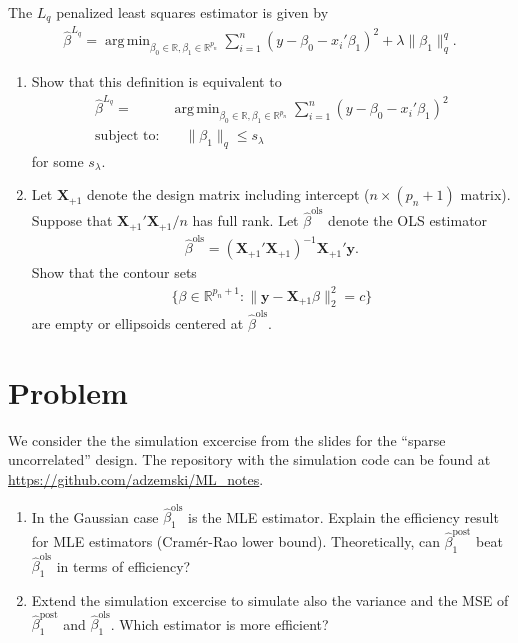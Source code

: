 \documentclass[a4paper]{scrartcl}
\DeclareMathOperator{\argmin}{arg\,min}
\begin{document}
The $L_q$ penalized least squares estimator is given by 
\begin{align*}
	\hat{\beta}^{L_q} = \argmin_{\beta_0 \in \mathbb{R}, \beta_1 \in \mathbb{R}^{p_n}} \sum_{i=1}^n \left(y - \beta_0 - x_i'\beta_1\right)^2 + \lambda \lVert \beta_1 \rVert_q^q. 
\end{align*}
\begin{enumerate}
	\item Show that this definition is equivalent to 
	\begin{align*}
		\hat{\beta}^{L_q} =& \argmin_{\beta_0 \in \mathbb{R}, \beta_1 \in \mathbb{R}^{p_n}} \sum_{i=1}^n \left(y - \beta_0 - x_i'\beta_1\right)^2
	\\
		\text{subject to:} & \quad  \lVert \beta_1 \rVert_q \leq s_{\lambda}
	\end{align*}
	for some $s_{\lambda}$.
	\item Let $\mathbf{X}_{+1}$ denote the design matrix including intercept ($n \times (p_n + 1)$ matrix). Suppose that $\mathbf{X}_{+1}'\mathbf{X}_{+1}/n$ has full rank. Let $\hat{\beta}^{\text{ols}}$ denote the OLS estimator 
	\begin{align*}
		\hat{\beta}^{\text{ols}} = \left(\mathbf{X}_{+1}'\mathbf{X}_{+1} \right)^{-1} \mathbf{X}_{+1}' \mathbf{y}.
	\end{align*}
	Show that the contour sets 
	\begin{align*}
		\big\{
	  		\beta \in \mathbb{R}^{p_n + 1} : \lVert \mathbf{y} - \mathbf{X}_{+1} \beta \rVert_2^2 = c 
		\big\}
	\end{align*}
	are empty or ellipsoids centered at $\hat{\beta}^{\text{ols}}$.
\end{enumerate}

\section*{Problem~}

We consider the the simulation excercise from the slides for the ``sparse uncorrelated'' design. The repository with the simulation code can be found at \url{https://github.com/adzemski/ML_notes}.

\begin{enumerate}
	\item In the Gaussian case $\hat{\beta}_1^{\text{ols}}$ is the MLE estimator. Explain the efficiency result for MLE estimators (Cram\'er-Rao lower bound). Theoretically, can $\hat{\beta}_1^{\text{post}}$ beat $\hat{\beta}_1^{\text{ols}}$ in terms of efficiency?
	\item 
	Extend the simulation excercise to simulate also the variance and the MSE of $\hat{\beta}_1^{\text{post}}$ and $\hat{\beta}_1^{\text{ols}}$. Which estimator is more efficient?
\end{enumerate}
\end{document}
